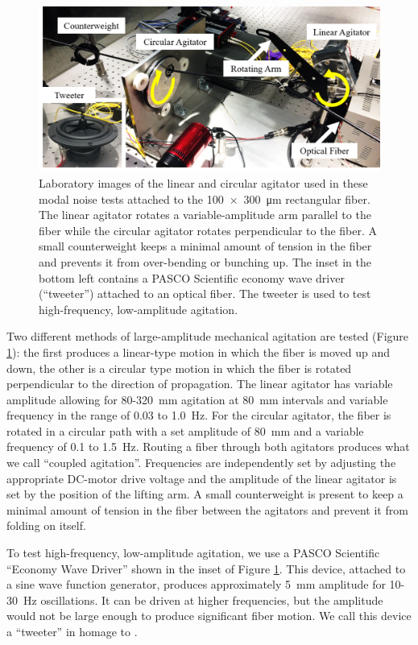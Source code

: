 \documentclass[twocolumn]{emulateapj}
\begin{document}
\begin{figure}
\centering
	\includegraphics[width=\columnwidth]{images/agitators_labelled.png}
	\caption{Laboratory images of the linear and circular agitator used in these modal noise tests attached to the \SI{100x300}{\micro\meter} rectangular fiber. The linear agitator rotates a variable-amplitude arm parallel to the fiber while the circular agitator rotates perpendicular to the fiber. A small counterweight keeps a minimal amount of tension in the fiber and prevents it from over-bending or bunching up. The inset in the bottom left contains a PASCO Scientific economy wave driver (``tweeter'') attached to an optical fiber. The tweeter is used to test high-frequency, low-amplitude agitation.}
\label{fig:agitators}
\end{figure}

Two different methods of large-amplitude mechanical agitation are tested (Figure \ref{fig:agitators}): the first produces a linear-type motion in which the fiber is moved up and down, the other is a circular type motion in which the fiber is rotated perpendicular to the direction of propagation. The linear agitator has variable amplitude allowing for 80-\SI{320}{\milli\meter} agitation at \SI{80}{\milli\meter} intervals and variable frequency in the range of 0.03 to \SI{1.0}{\hertz}. For the circular agitator, the fiber is rotated in a circular path with a set amplitude of \SI{80}{\milli\meter} and a variable frequency of 0.1 to \SI{1.5}{\hertz}. Routing a fiber through both agitators produces what we call ``coupled agitation''.  Frequencies are independently set by adjusting the appropriate DC-motor drive voltage and the amplitude of the linear agitator is set by the position of the lifting arm. A small counterweight is present to keep a minimal amount of tension in the fiber between the agitators and prevent it from folding on itself.

To test high-frequency, low-amplitude agitation, we use a PASCO Scientific ``Economy Wave Driver'' shown in the inset of Figure \ref{fig:agitators}. This device, attached to a sine wave function generator, produces approximately \SI{5}{\milli\meter} amplitude for 10-\SI{30}{\hertz} oscillations. It can be driven at higher frequencies, but the amplitude would not be large enough to produce significant fiber motion. We call this device a ``tweeter'' in homage to \citet{Plavchan2013}.
\end{document}
